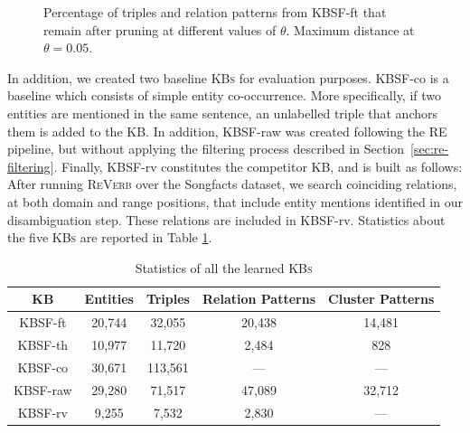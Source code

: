 \begin{figure}[!htp]
\centerline{}
\caption{Percentage of triples and relation patterns from \textsc{KBSF}-ft that remain after pruning at different values of $\theta$. Maximum distance at $\theta=0.05$.}
\label{fig:th}
\end{figure}

In addition, we created two baseline \textsc{KBs} for evaluation purposes. \textsc{KBSF}-co is a baseline which consists of simple entity co-occurrence. More specifically, if two entities are mentioned in the same sentence, an unlabelled triple that anchors them is added to the KB. In addition, \textsc{KBSF}-raw was created following the \textsc{RE} pipeline, but without applying the filtering process described in Section~\ref{sec:re-filtering}. Finally, \textsc{KBSF}-rv constitutes the competitor \textsc{KB}, and is built as follows: After running \textsc{ReVerb} over the Songfacts dataset, we search coinciding relations, at both domain and range positions, that include entity mentions identified in our disambiguation step. These relations are included in KBSF-rv. Statistics about the five \textsc{KBs} are reported in Table \ref{tab:kbs}.

\begin{table}[ht!]
\scriptsize
\centering
	\begin{tabular}{ | c | c | c | c | c | }
	\hline
	\textbf{KB} & \textbf{Entities} & \textbf{Triples} & \textbf{Relation Patterns} & \textbf{Cluster Patterns} \\
	\hline
	\textsc{KBSF}-ft & 20,744 & 32,055 & 20,438 & 14,481 \\
	\textsc{KBSF}-th & 10,977 & 11,720 & 2,484 & 828 \\
	\hline
	\textsc{KBSF}-co & 30,671 & 113,561 & --- & --- \\
	\textsc{KBSF}-raw & 29,280 & 71,517 & 47,089 & 32,712 \\
	\hline
	\textsc{KBSF}-rv & 9,255 & 7,532 & 2,830 & --- \\
	\hline
	\end{tabular}
	\caption{Statistics of all the learned \textsc{KBs}}
	\label{tab:kbs}
\end{table}


